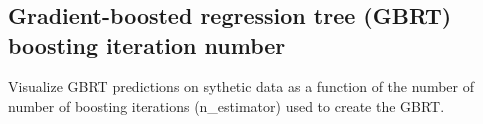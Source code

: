\documentclass[11pt]{article}
\begin{document}
    \begin{center}
    \end{center}
    { \hspace*{\fill} \\}
    
    \begin{center}
    \end{center}
    { \hspace*{\fill} \\}
    
    \begin{center}
    \end{center}
    { \hspace*{\fill} \\}
    
    \subsection{Gradient-boosted regression tree (GBRT) boosting iteration
number}\label{gradient-boosted-regression-tree-gbrt-boosting-iteration-number}

Visualize GBRT predictions on sythetic data as a function of the number
of number of boosting iterations (n\_estimator) used to create the GBRT.
\end{document}
